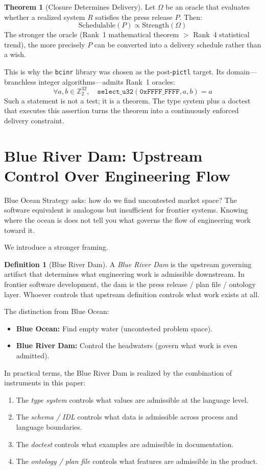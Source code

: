 \documentclass[11pt,a4paper]{article}
\theoremstyle{definition}
\newtheorem{theorem}{Theorem}
\newtheorem{definition}{Definition}
\begin{document}
\begin{theorem}[Closure Determines Delivery]
Let $\Omega$ be an oracle that evaluates whether a realized system $R$ satisfies the press release $P$. Then:
$$\text{Schedulable}(P) \propto \text{Strength}(\Omega)$$
The stronger the oracle (Rank~1 mathematical theorem $>$ Rank~4 statistical trend), the more precisely $P$ can be converted into a delivery schedule rather than a wish.
\end{theorem}

This is why the \texttt{bcinr} library was chosen as the post-\texttt{pictl} target. Its domain---branchless integer algorithms---admits Rank~1 oracles:
$$\forall a, b \in \mathbb{Z}_2^{32},\quad \texttt{select\_u32}(\texttt{0xFFFF\_FFFF}, a, b) = a$$
Such a statement is not a test; it is a theorem. The type system plus a doctest that executes this assertion turns the theorem into a continuously enforced delivery constraint.

\section{Blue River Dam: Upstream Control Over Engineering Flow}

Blue Ocean Strategy asks: how do we find uncontested market space? The software equivalent is analogous but insufficient for frontier systems. Knowing where the ocean is does not tell you what governs the flow of engineering work toward it.

We introduce a stronger framing.

\begin{definition}[Blue River Dam]
A \emph{Blue River Dam} is the upstream governing artifact that determines what engineering work is admissible downstream. In frontier software development, the dam is the press release / plan file / ontology layer. Whoever controls that upstream definition controls what work exists at all.
\end{definition}

The distinction from Blue Ocean:
\begin{itemize}
\item \textbf{Blue Ocean:} Find empty water (uncontested problem space).
\item \textbf{Blue River Dam:} Control the headwaters (govern what work is even admitted).
\end{itemize}

In practical terms, the Blue River Dam is realized by the combination of instruments in this paper:
\begin{enumerate}
\item The \emph{type system} controls what values are admissible at the language level.
\item The \emph{schema / IDL} controls what data is admissible across process and language boundaries.
\item The \emph{doctest} controls what examples are admissible in documentation.
\item The \emph{ontology / plan file} controls what features are admissible in the product.
\end{enumerate}
\end{document}
